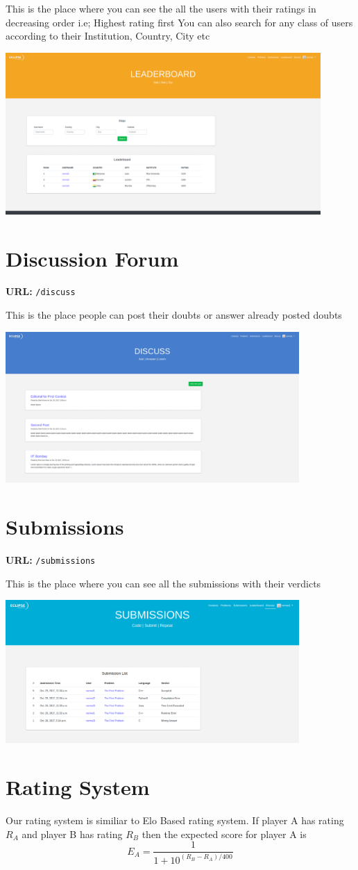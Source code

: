 \documentclass[hidelinks, a4paper,12pt, titlepage]{article}
\begin{document}
This is the place where you can see the all the users with their ratings in decreasing order i.e; Highest rating first
You can also search for any class of users according to their Institution, Country, City etc
\begin{center}\includegraphics[width=0.9\textwidth]{leaderboard.png}\end{center} 
 
\newpage

\section{Discussion Forum}
\textbf{URL:} \texttt{/discuss}

This is the place people can post their doubts or answer already posted doubts
\begin{center}\includegraphics[width=0.84\textwidth]{Discuss.png}\end{center} 


\section{Submissions}
\textbf{URL:} \texttt{/submissions}

This is the place where you can see all the submissions with their verdicts
\begin{center}\includegraphics[width=0.84\textwidth]{submissions.png}\end{center} 
 

\section{Rating System}
Our rating system is similiar to Elo Based rating system. If player A has rating $R_A$ and player B has rating $R_B$ then the expected score for player A is $$E_A = \frac{1}{1+10^{(R_B-R_A)/400}}$$
\end{document}
